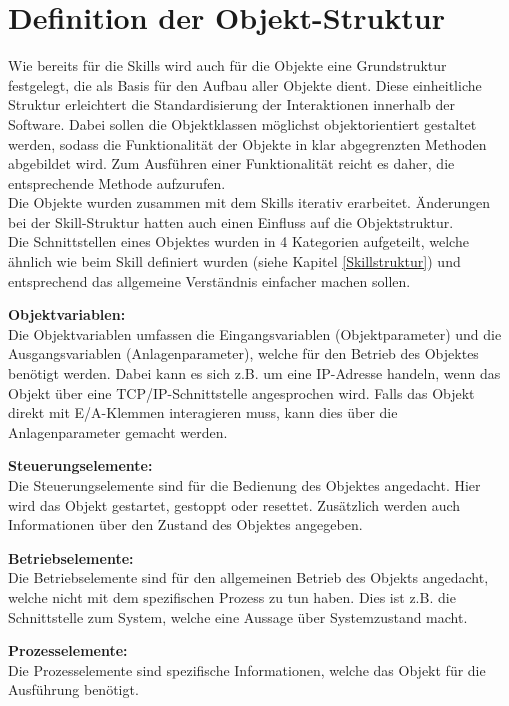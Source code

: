 \section{Definition der Objekt-Struktur} \label{Objektstruktur}

	Wie bereits für die Skills wird auch für die Objekte eine Grundstruktur festgelegt, die als Basis für den Aufbau aller Objekte dient. Diese einheitliche Struktur erleichtert die Standardisierung der Interaktionen innerhalb der Software. Dabei sollen die Objektklassen möglichst objektorientiert gestaltet werden, sodass die Funktionalität der Objekte in klar abgegrenzten Methoden abgebildet wird. Zum Ausführen einer Funktionalität reicht es daher, die entsprechende Methode aufzurufen. 
	\\
	Die Objekte wurden zusammen mit dem Skills iterativ erarbeitet. Änderungen bei der Skill-Struktur hatten auch einen Einfluss auf die Objektstruktur. 
	\\
	Die Schnittstellen eines Objektes wurden in 4 Kategorien aufgeteilt, welche ähnlich wie beim Skill definiert wurden (siehe Kapitel \ref{Skillstruktur}) und entsprechend das allgemeine Verständnis einfacher machen sollen. 
	
	\textbf{Objektvariablen:}
	\vspace{2mm} 
	\\
	Die Objektvariablen umfassen die Eingangsvariablen (Objektparameter) und die Ausgangsvariablen (Anlagenparameter), welche für den Betrieb des Objektes benötigt werden. Dabei kann es sich z.B. um eine IP-Adresse handeln, wenn das Objekt über eine TCP/IP-Schnittstelle angesprochen wird. Falls das Objekt direkt mit E/A-Klemmen interagieren muss, kann dies über die Anlagenparameter gemacht werden. 
	
	
	\textbf{Steuerungselemente:}
	\vspace{2mm} 
	\\
	Die Steuerungselemente sind für die Bedienung des Objektes angedacht. Hier wird das Objekt gestartet, gestoppt oder resettet. Zusätzlich werden auch Informationen über den Zustand des Objektes angegeben.
	
	
	\textbf{Betriebselemente:}
	\vspace{2mm} 
	\\
	Die Betriebselemente sind für den allgemeinen Betrieb des Objekts angedacht, welche nicht mit dem spezifischen Prozess zu tun haben. Dies ist z.B. die Schnittstelle zum System, welche eine Aussage über Systemzustand macht.
	
	
	\textbf{Prozesselemente:}
	\vspace{2mm} 
	\\
	Die Prozesselemente sind spezifische Informationen, welche das Objekt für die Ausführung benötigt.
	
